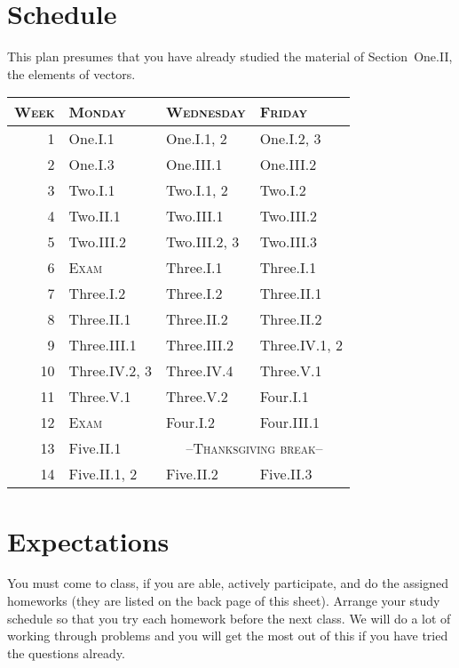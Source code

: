 \documentclass{article}
\begin{document}
\section{Schedule}
This plan presumes that you have already studied the material of 
Section~One.II, the elements of vectors.
\newcommand{\classday}[1]{\textsc{#1}}
\newcommand{\colwidth}{1.0in}
\begin{center} \small   %
   \begin{tabular}{r|*{2}{p{\colwidth}}l}
      \multicolumn{1}{r}{\textsc{Week}}  
       &\textsc{Monday}          
       &\textsc{Wednesday}            
       &\textsc{Friday}        \\ \hline
       1    &One.I.1         &One.I.1, 2        &One.I.2, 3         \\
       2    &One.I.3         &One.III.1          &One.III.2         \\
       3    &Two.I.1         &Two.I.1, 2         &Two.I.2         \\
       4    &Two.II.1         &Two.III.1         &Two.III.2         \\
       5    &Two.III.2        &Two.III.2, 3         &Two.III.3        \\
       6    &\classday{Exam}   &Three.I.1         &Three.I.1       \\
       7    &Three.I.2         &Three.I.2          &Three.II.1         \\
       8    &Three.II.1        &Three.II.2          &Three.II.2          \\
       9    &Three.III.1       &Three.III.2         &Three.IV.1, 2       \\
      10    &Three.IV.2, 3   &Three.IV.4          &Three.V.1          \\
      11    &Three.V.1       &Three.V.2            &Four.I.1         \\
      12    &\classday{Exam}  &Four.I.2            &Four.III.1       \\
      13    &Five.II.1    &\multicolumn{2}{c}{\classday{--Thanksgiving break--}} \\
      14    &Five.II.1, 2     &Five.II.2          &Five.II.3        
   \end{tabular}
\end{center}

\section{Expectations}
You must come to class, if you are able, 
actively participate,
and do the assigned homeworks 
(they are listed on the back page of this sheet).
Arrange your study schedule so that you try each homework before the next class.
We will do a lot of working through problems and you
will get the most out of this if you have tried the questions already.
\end{document}
